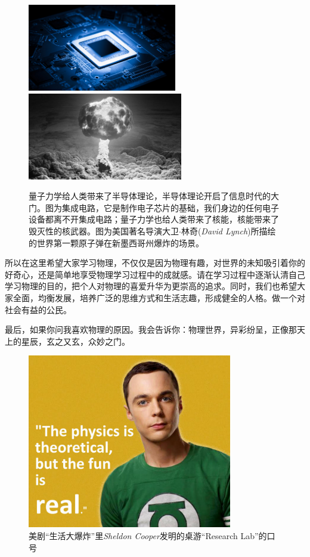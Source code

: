 \begin{figure}[H]
\begin{center}
\includegraphics[height=1.5in]{images/pre_5.pdf}
\includegraphics[height=1.5in]{images/pre_6.pdf}
\caption{量子力学给人类带来了半导体理论，半导体理论开启了信息时代的大门。图为集成电路，它是制作电子芯片的基础，我们身边的任何电子设备都离不开集成电路；量子力学也给人类带来了核能，核能带来了毁灭性的核武器。图为美国著名导演大卫$\cdot$林奇({\it David Lynch})所描绘的世界第一颗原子弹在新墨西哥州爆炸的场景。}
\end{center}
\end{figure}

所以在这里希望大家学习物理，不仅仅是因为物理有趣，对世界的未知吸引着你的好奇心，还是简单地享受物理学习过程中的成就感。请在学习过程中逐渐认清自己学习物理的目的，把个人对物理的喜爱升华为更崇高的追求。同时，我们也希望大家全面，均衡发展，培养广泛的思维方式和生活志趣，形成健全的人格。做一个对社会有益的公民。

最后，如果你问我喜欢物理的原因。我会告诉你：物理世界，异彩纷呈，正像那天上的星辰，玄之又玄，众妙之门。
\begin{figure}[H]
\begin{center}
\includegraphics[height=3in]{images/pre_7.pdf}
\caption{美剧``{\kaishu 生活大爆炸}''里{\it Sheldon Cooper}发明的桌游``Research Lab''的口号}
\end{center}
\end{figure}
